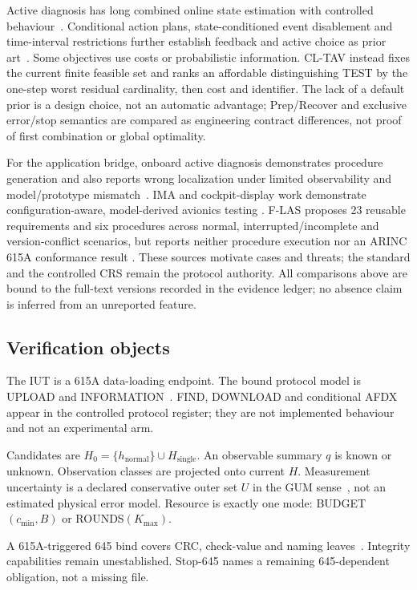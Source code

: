 Active diagnosis has long combined online state estimation with controlled
behaviour~\cite{sampath1998}. Conditional action plans, state-conditioned event
disablement and time-interval restrictions further establish feedback and
active choice as prior art~\cite{chanthery2009,hu2020,miao2025}. Some objectives
use costs or probabilistic information. CL-TAV instead fixes the current finite
feasible set and ranks an affordable distinguishing TEST by the one-step worst
residual cardinality, then cost and identifier. The lack of a default prior is a
design choice, not an automatic advantage; Prep/Recover and exclusive error/stop
semantics are compared as engineering contract differences, not proof of first
combination or global optimality.

For the application bridge, onboard active diagnosis demonstrates procedure
generation and also reports wrong localization under limited observability and
model/prototype mismatch~\cite{chanthery2019}. IMA and cockpit-display work
demonstrate configuration-aware, model-derived avionics testing
\cite{efkemann2011,sartaj2021}. F-LAS proposes 23 reusable requirements and six
procedures across normal, interrupted/incomplete and version-conflict scenarios,
but reports neither procedure execution nor an ARINC 615A conformance result
\cite{marques2021}. These sources motivate cases and threats; the standard and
the controlled CRS remain the protocol authority. All comparisons above are
bound to the full-text versions recorded in the evidence ledger; no absence
claim is inferred from an unreported feature.

\subsection{Verification objects}
The IUT is a 615A data-loading endpoint. The bound protocol model is UPLOAD
and INFORMATION~\cite{arinc615a3}. FIND, DOWNLOAD and conditional AFDX appear
in the controlled protocol register; they are not implemented behaviour and
not an experimental arm.

Candidates are \(H_0=\{h_{\mathrm{normal}}\}\cup H_{\mathrm{single}}\).
An observable summary \(q\) is known or unknown. Observation classes are
projected onto current \(H\). Measurement uncertainty is a declared
conservative outer set \(U\) in the GUM sense~\cite{jcgm100,jcgm106}, not an
estimated physical error model. Resource is exactly one mode:
BUDGET\((c_{\min},B)\) or ROUNDS\((K_{\max})\).

A 615A-triggered 645 bind covers CRC, check-value and naming
leaves~\cite{arinc6451}. Integrity capabilities remain unestablished.
Stop-645 names a remaining 645-dependent obligation, not a missing file.
